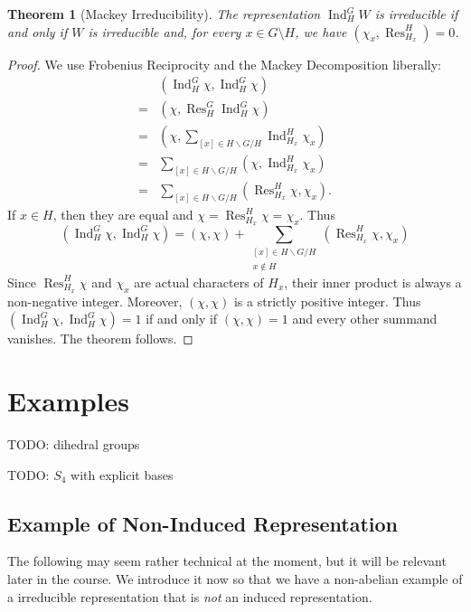 \documentclass[12pt]{article}
\theoremstyle{plain}
\newtheorem{theorem}{Theorem}[section]
\theoremstyle{definition}
\theoremstyle{remark}
\numberwithin{equation}{section}
\begin{document}
\begin{theorem}[Mackey Irreducibility]
The representation $\operatorname{Ind}^G_H W$ is irreducible
if and only if $W$ is irreducible and,
for every $x \in G \setminus H$,
we have $( \chi_x, \operatorname{Res}^H_{H_x} )=0$.
\end{theorem}

\begin{proof}
We use Frobenius Reciprocity and the Mackey Decomposition liberally:
\begin{align*}
&( \operatorname{Ind}^G_H \chi, \operatorname{Ind}^G_H \chi )\\
=&( \chi, \operatorname{Res}^G_H \operatorname{Ind}^G_H \chi )\\
=&( \chi, \sum_{[x] \in H\backslash G / H}
\operatorname{Ind}_{H_x}^H \chi_x )\\
=&\sum_{[x] \in H\backslash G / H} ( \chi, 
\operatorname{Ind}_{H_x}^H \chi_x )\\
=&\sum_{[x] \in H\backslash G / H} ( \operatorname{Res}_{H_x}^H\chi, 
 \chi_x ).
\end{align*}
If $x \in H$, then they are equal and
$\chi=\operatorname{Res}_{H_x}^H\chi = \chi_x$.
Thus
\[
( \operatorname{Ind}^G_H \chi, \operatorname{Ind}^G_H \chi )
=(\chi,\chi)+
\sum_{\substack{[x] \in H\backslash G / H\\x \not\in  H}}
( \operatorname{Res}_{H_x}^H\chi,  \chi_x )
\]
Since $\operatorname{Res}_{H_x}^H\chi$ and $\chi_x$ are actual
characters of $H_x$, their inner product is always a non-negative integer.
Moreover, $(\chi,\chi)$ is a strictly positive integer.
Thus
$( \operatorname{Ind}^G_H \chi, \operatorname{Ind}^G_H \chi )=1$
if and only if $(\chi,\chi)=1$ and every other
summand vanishes.
The theorem follows.
\end{proof}

\section{Examples}

TODO: dihedral groups

TODO: $S_4$ with explicit bases

\subsection{Example of Non-Induced Representation}

The following may seem rather technical at the moment, but it will be
relevant later in the course.  We introduce it now so that we have a
non-abelian example of a irreducible representation that is
\emph{not} an induced representation.
\end{document}
